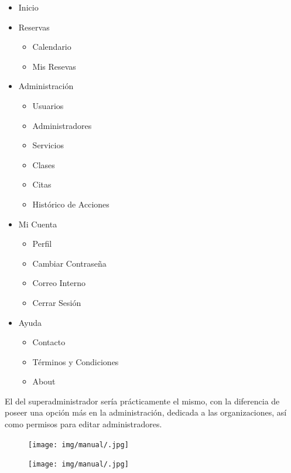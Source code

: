 \begin{itemize}
\item Inicio
\item Reservas

\begin{itemize}
\item Calendario
\item Mis Resevas
\end{itemize}

\item Administración

\begin{itemize}
\item Usuarios
\item Administradores
\item Servicios
\item Clases
\item Citas
\item Histórico de Acciones
\end{itemize}

\item Mi Cuenta

\begin{itemize}
\item Perfil
\item Cambiar Contraseña
\item Correo Interno
\item Cerrar Sesión
\end{itemize}

\item Ayuda

\begin{itemize}
\item Contacto
\item Términos y Condiciones
\item About
\end{itemize}

\end{itemize}

El del superadministrador sería prácticamente el mismo, con la diferencia de poseer una opción más en la administración, dedicada a las organizaciones, así como permisos para editar administradores.



\begin{figure}
\centering
  \texttt{[image: img/manual/.jpg]}
  \caption{\textit{}}
  \label{fig:}
\end{figure}



\begin{figure}
\centering
  \texttt{[image: img/manual/.jpg]}
  \caption{\textit{}}
  \label{fig:}
\end{figure}






